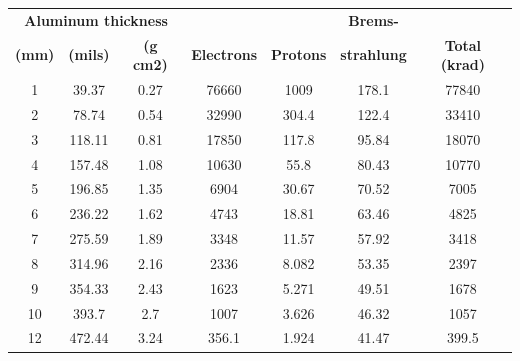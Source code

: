 \begin{table}[htbp]
  \centering
  
    \begin{tabular}{|c|c|c|r|r|c|r|}
    \hline
    \multicolumn{3}{|c|}{\textbf{Aluminum thickness}} &       &       & \textbf{Brems- } &  \bigstrut\\
\cline{1-3}    \textbf{(mm)} & \textbf{(mils)} & \textbf{(g cm2)} & \multicolumn{1}{c|}{\textbf{Electrons}} & \multicolumn{1}{c|}{\textbf{Protons}} & \textbf{strahlung} & \multicolumn{1}{c|}{\textbf{Total (krad)}} \bigstrut\\
    \hline
    1     & 39.37 & 0.27  & \multicolumn{1}{c|}{76660} & \multicolumn{1}{c|}{1009} & 178.1 & \multicolumn{1}{c|}{77840} \bigstrut\\
    \hline
    2     & 78.74 & 0.54  & \multicolumn{1}{c|}{32990} & \multicolumn{1}{c|}{304.4} & 122.4 & \multicolumn{1}{c|}{33410} \bigstrut\\
    \hline
    3     & 118.11 & 0.81  & \multicolumn{1}{c|}{17850} & \multicolumn{1}{c|}{117.8} & 95.84 & \multicolumn{1}{c|}{18070} \bigstrut\\
    \hline
    4     & 157.48 & 1.08  & \multicolumn{1}{c|}{10630} & \multicolumn{1}{c|}{55.8} & 80.43 & \multicolumn{1}{c|}{10770} \bigstrut\\
    \hline
    5     & 196.85 & 1.35  & \multicolumn{1}{c|}{6904} & \multicolumn{1}{c|}{30.67} & 70.52 & \multicolumn{1}{c|}{7005} \bigstrut\\
    \hline
    6     & 236.22 & 1.62  & \multicolumn{1}{c|}{4743} & \multicolumn{1}{c|}{18.81} & 63.46 & \multicolumn{1}{c|}{4825} \bigstrut\\
    \hline
    7     & 275.59 & 1.89  & \multicolumn{1}{c|}{3348} & \multicolumn{1}{c|}{11.57} & 57.92 & \multicolumn{1}{c|}{3418} \bigstrut\\
    \hline
    8     & 314.96 & 2.16  & \multicolumn{1}{c|}{2336} & \multicolumn{1}{c|}{8.082} & 53.35 & \multicolumn{1}{c|}{2397} \bigstrut\\
    \hline
    9     & 354.33 & 2.43  & \multicolumn{1}{c|}{1623} & \multicolumn{1}{c|}{5.271} & 49.51 & \multicolumn{1}{c|}{1678} \bigstrut\\
    \hline
    10    & 393.7 & 2.7   & \multicolumn{1}{c|}{1007} & \multicolumn{1}{c|}{3.626} & 46.32 & \multicolumn{1}{c|}{1057} \bigstrut\\
    \hline
    12    & 472.44 & 3.24  & \multicolumn{1}{c|}{356.1} & \multicolumn{1}{c|}{1.924} & 41.47 & \multicolumn{1}{c|}{399.5} \bigstrut\\

\end{tabular}
\end{table}
